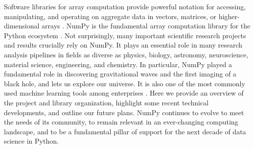 




Software libraries for array computation provide powerful notation
for accessing, manipulating, and operating on aggregate data in vectors,
matrices, or higher-dimensional arrays \cite{iverson1980notation}.
NumPy is the fundamental array computation library for the Python ecosystem
\cite{dubois2007guest,oliphant2007python,millman2011python,perez2011python}.
Not surprisingly, many important scientific research projects and results
crucially rely on NumPy.
It plays an essential role in many research analysis pipelines in fields as
diverse as physics, biology, astronomy, neuroscience, material science,
engineering, and chemistry.
In particular, NumPy played a fundamental role in discovering gravitational
waves\cite{pycbc} and the first imaging of a black hole\cite{eht-imaging}, and
lets us explore our universe\cite{jenness2018lsst}.
It is also one of the most commonly used machine learning tools among
enterprises \cite{451report2018}.
Here we provide an overview of the project and library organization,  highlight
some recent technical developments, and outline our future plans.
NumPy continues to evolve to meet the needs of its community, to remain
relevant in an ever-changing computing landscape, and to be a fundamental
pillar of support for the next decade of data science in Python.
